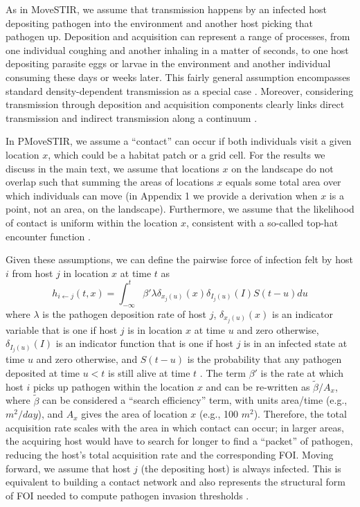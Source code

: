 \documentclass[letterpaper]{article}
\begin{document}
As in MoveSTIR, we assume that transmission happens by an infected host depositing pathogen into the environment and another host picking that pathogen up. 
Deposition and acquisition can represent a range of processes, from one individual coughing and another inhaling in a matter of seconds, to one host depositing parasite eggs or larvae in the environment and another individual consuming these days or weeks later. 
This fairly general assumption encompasses standard density-dependent transmission as a special case \citep{Cortez2021}. 
Moreover, considering transmission through deposition and acquisition components clearly links direct transmission and indirect transmission along a continuum \citep{Wilber2022}.

In PMoveSTIR, we assume a ``contact'' can occur if both individuals visit a given location $x$, which could be a habitat patch or a grid cell. 
For the results we discuss in the main text, we assume that locations $x$ on the landscape do not overlap such that summing the areas of locations $x$ equals some total area over which individuals can move (in Appendix 1 we provide a derivation when $x$ is a point, not an area, on the landscape). 
Furthermore, we assume that the likelihood of contact is uniform within the location $x$, consistent with a so-called top-hat encounter function \citep{Gurarie2013,Wilber2022}.

Given these assumptions, we can define the pairwise force of infection felt by host $i$ from host $j$ in location $x$ at time $t$ as \citep{Wilber2022}
\begin{equation}
    h_{i \leftarrow j}(t, x) = \int_{-\infty}^{t} \beta' \lambda \delta_{x_j(u)}(x) \delta_{I_j(u)}(I) S(t - u) du
    \label{eq:original_foi}
\end{equation}
where $\lambda$ is the pathogen deposition rate of host $j$, $\delta_{x_j(u)}(x)$ is an indicator variable that is one if host $j$ is in location $x$ at time $u$ and zero otherwise, $\delta_{I_j(u)}(I)$ is an indicator function that is one if host $j$ is in an infected state at time $u$ and zero otherwise, and $S(t-u)$ is the probability that any pathogen deposited at time $u < t$ is still alive at time $t$ \citep[see][for a full derivation]{Wilber2022}. 
The term $\beta'$ is the rate at which host $i$ picks up pathogen within the location $x$ and can be re-written as $\tilde{\beta} / A_x$, where $\tilde{\beta}$ can be considered a ``search efficiency'' term, with units area/time (e.g., $m^2 / day$), and $A_x$ gives the area of location $x$ (e.g., 100 $m^2$). 
Therefore, the total acquisition rate scales with the area in which contact can occur; in larger areas, the acquiring host would have to search for longer to find a ``packet'' of pathogen, reducing the host's total acquisition rate and the corresponding FOI. Moving forward, we assume that host $j$ (the depositing host) is always infected.  This is equivalent to building a contact network and also represents the structural form of FOI needed to compute pathogen invasion thresholds \citep{Wilber2022}.
\end{document}
